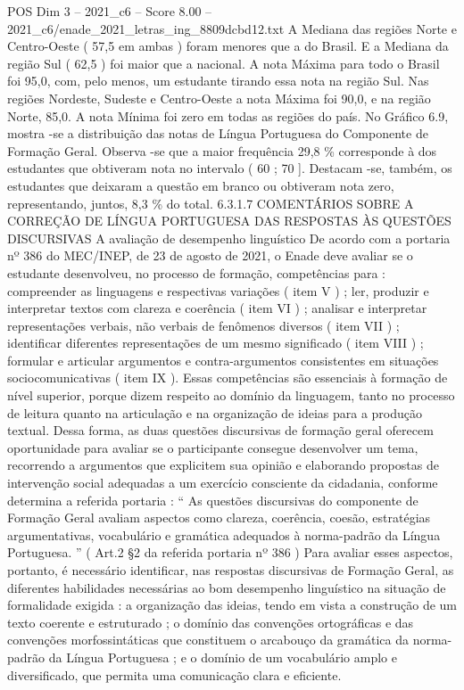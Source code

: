 \begin{textsample}{POS Dim 3 – 2021\_c6 – Score 8.00 – 2021\_c6/enade\_2021\_letras\_ing\_8809dcbd12.txt}
A Mediana das regiões Norte e Centro-Oeste ( 57,5 em ambas ) foram menores que a do Brasil.
E a Mediana da região Sul ( 62,5 ) foi maior que a nacional.
A nota Máxima para todo o Brasil foi 95,0, com, pelo menos, um estudante tirando essa nota na região Sul.
Nas regiões Nordeste, Sudeste e Centro-Oeste a nota Máxima foi 90,0, e na região Norte, 85,0.
A nota Mínima foi zero em todas as regiões do país.
No Gráfico 6.9, mostra -se a distribuição das notas de Língua Portuguesa do Componente de Formação Geral.
Observa -se que a maior frequência 29,8 \% corresponde à dos estudantes que obtiveram nota no intervalo ( 60 ; 70 ].
Destacam -se, também, os estudantes que deixaram a questão em branco ou obtiveram nota zero, representando, juntos, 8,3 \% do total. 6.3.1.7 COMENTÁRIOS SOBRE A CORREÇÃO DE LÍNGUA PORTUGUESA DAS RESPOSTAS ÀS QUESTÕES DISCURSIVAS A avaliação de desempenho linguístico De acordo com a portaria nº 386 do MEC/INEP, de 23 de agosto de 2021, o Enade deve avaliar se o estudante desenvolveu, no processo de formação, competências para : compreender as linguagens e respectivas variações ( item V ) ; ler, produzir e interpretar textos com clareza e coerência ( item VI ) ; analisar e interpretar representações verbais, não verbais de fenômenos diversos ( item VII ) ; identificar diferentes representações de um mesmo significado ( item VIII ) ; formular e articular argumentos e contra-argumentos consistentes em situações sociocomunicativas ( item IX ).
Essas competências são essenciais à formação de nível superior, porque dizem respeito ao domínio da linguagem, tanto no processo de leitura quanto na articulação e na organização de ideias para a produção textual.
Dessa forma, as duas questões discursivas de formação geral oferecem oportunidade para avaliar se o participante consegue desenvolver um tema, recorrendo a argumentos que explicitem sua opinião e elaborando propostas de intervenção social adequadas a um exercício consciente da cidadania, conforme determina a referida portaria : “ As questões discursivas do componente de Formação Geral avaliam aspectos como clareza, coerência, coesão, estratégias argumentativas, vocabulário e gramática adequados à norma-padrão da Língua Portuguesa. ” ( Art.2 §2 da referida portaria nº 386 ) Para avaliar esses aspectos, portanto, é necessário identificar, nas respostas discursivas de Formação Geral, as diferentes habilidades necessárias ao bom desempenho linguístico na situação de formalidade exigida : a organização das ideias, tendo em vista a construção de um texto coerente e estruturado ; o domínio das convenções ortográficas e das convenções morfossintáticas que constituem o arcabouço da gramática da norma-padrão da Língua Portuguesa ; e o domínio de um vocabulário amplo e diversificado, que permita uma comunicação clara e eficiente.

\end{textsample}
